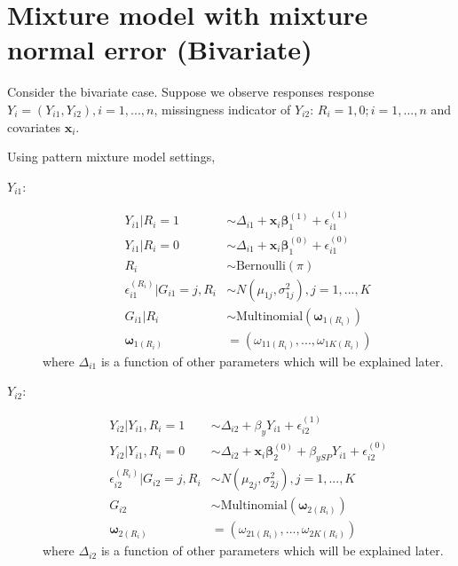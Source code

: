 \section{Mixture model with mixture normal error (Bivariate)}

Consider the bivariate case.
Suppose we observe responses response $Y_i = (Y_{i1}, Y_{i2}), i = 1, ..., n$, missingness indicator of $Y_{i2}$: $R_i = 1, 0; i = 1, ..., n$ and covariates $\bm x_{i}$.

Using pattern mixture model settings,
\begin{description}
\item[$Y_{i1}$:]
\begin{align*}
Y_{i1} | R_{i}= 1                          & \sim \Delta_{i1} + \bm x_i \bm \beta_1^{(1)} + \epsilon_{i1}^{(1)}                      \\
Y_{i1} | R_{i}= 0                          & \sim \Delta_{i1} + \bm x_i \bm \beta_1^{(0)} + \epsilon_{i1}^{(0)}                      \\
R_i                                        & \sim \mbox{Bernoulli}(\pi)                                                              \\
\epsilon_{i1}^{(R_i)} | G_{i1}= j, R_i     & \sim N(\mu_{1j}, \sigma_{1j}^2) , j = 1, ..., K                                         \\
G_{i1}|R_i                                 & \sim \mbox{Multinomial} (\bm \omega_{1(R_i)})                                           \\
\bm \omega_{1(R_i)}                        & = (\omega_{11(R_i)}, ..., \omega_{1K(R_i)})
\end{align*}
where $\Delta_{i1}$ is a function of other parameters which will be explained later.
\item[$Y_{i2}$:]
  \begin{align*}
    Y_{i2} | Y_{i1}, R_i= 1                & \sim \Delta_{i2} + \beta_y Y_{i1} + \epsilon_{i2}^{(1)}                                 \\
    Y_{i2} | Y_{i1}, R_i= 0                & \sim \Delta_{i2} + \bm x_i \bm \beta_2^{(0)} + \beta_{ySP} Y_{i1} + \epsilon_{i2}^{(0)} \\
    \epsilon_{i2}^{(R_i)} | G_{i2}= j, R_i & \sim N(\mu_{2j}, \sigma_{2j}^2) , j = 1, ..., K                                         \\
    G_{i2}                                 & \sim \mbox{Multinomial} (\bm \omega_{2(R_i)})                                           \\
    \bm \omega_{2(R_i)}                    & = (\omega_{21(R_i)}, ..., \omega_{2K(R_i)})
  \end{align*}
where $\Delta_{i2}$ is a function of other parameters which will be
explained later.
\end{description}


